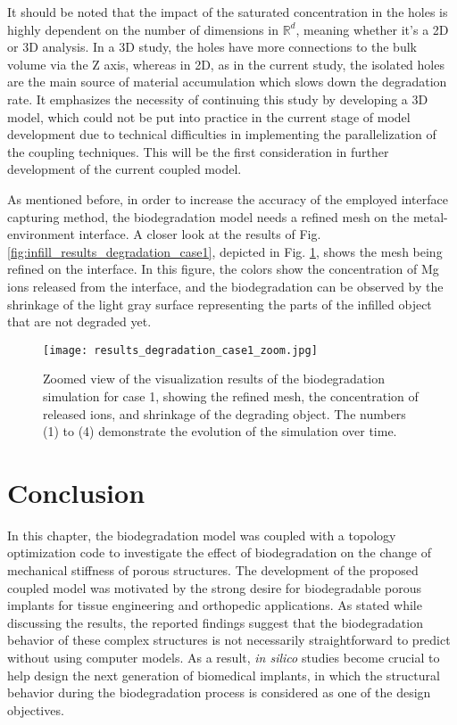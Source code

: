It should be noted that the impact of the saturated concentration in the holes is highly dependent on the number of dimensions in $\mathbb{R}^d$, meaning whether it's a 2D or 3D analysis. In a 3D study, the holes have more connections to the bulk volume via the Z axis, whereas in 2D, as in the current study, the isolated holes are the main source of material accumulation which slows down the degradation rate. It emphasizes the necessity of continuing this study by developing a 3D model, which could not be put into practice in the current stage of model development due to technical difficulties in implementing the parallelization of the coupling techniques. This will be the first consideration in further development of the current coupled model.

As mentioned before, in order to increase the accuracy of the employed interface capturing method, the biodegradation model needs a refined mesh on the metal-environment interface. A closer look at the results of Fig. \ref{fig:infill_results_degradation_case1}, depicted in Fig. \ref{fig:infill_results_degradation_case1_zoom}, shows the mesh being refined on the interface. In this figure, the colors show the concentration of Mg ions released from the interface, and the biodegradation can be observed by the shrinkage of the light gray surface representing the parts of the infilled object that are not degraded yet.


\begin{figure}[h]
\centering
\medskip
\texttt{[image: results\_degradation\_case1\_zoom.jpg]}
\caption[Zoom view of the results of the biodegradation simulation for case 1]{Zoomed view of the visualization results of the biodegradation simulation for case 1, showing the refined mesh, the concentration of released ions, and shrinkage of the degrading object. The numbers (1) to (4) demonstrate the evolution of the simulation over time.} \label{fig:infill_results_degradation_case1_zoom}
\end{figure}

\section{Conclusion}

In this chapter, the biodegradation model was coupled with a topology optimization code to investigate the effect of biodegradation on the change of mechanical stiffness of porous structures. The development of the proposed coupled model was motivated by the strong desire for biodegradable porous implants for tissue engineering and orthopedic applications. As stated while discussing the results, the reported findings suggest that the biodegradation behavior of these complex structures is not necessarily straightforward to predict without using computer models. As a result, \textit{in silico} studies become crucial to help design the next generation of biomedical implants, in which the structural behavior during the biodegradation process is considered as one of the design objectives.

